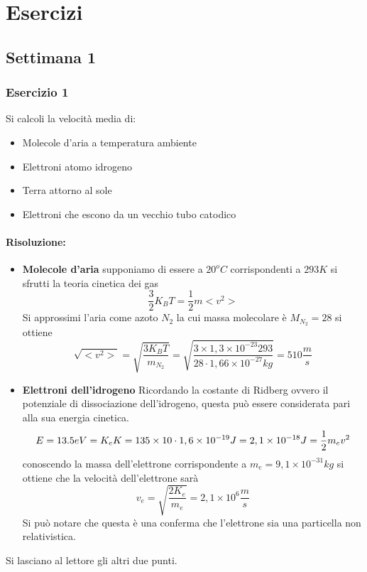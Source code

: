 
\section{Esercizi}
\subsection{Settimana 1}
\subsubsection{Esercizio 1}
Si calcoli la velocità media di:
\begin{itemize}
\item Molecole d'aria a temperatura ambiente
\item Elettroni atomo idrogeno
\item Terra attorno al sole
\item Elettroni che escono da un vecchio tubo catodico
\end{itemize}

\paragraph{Risoluzione:}
\begin{itemize}
\item \textbf{Molecole d'aria}
supponiamo di essere a $20^oC$ corrispondenti a $293K$ si sfrutti la teoria cinetica dei gas
\begin{equation}
\frac{3}{2}K_BT=\frac{1}{2}m<v^2>
\end{equation}
Si approssimi l'aria come azoto $N_2$ la cui massa molecolare è $M_{N_2}=28$
si ottiene
\begin{equation}
\sqrt{<v^2>}=\sqrt{\frac{3K_BT}{m_{N_2}}}=\sqrt{\frac{3\times1,3\times10^{-23}293}{28\cdot 1,66\times10^{-27}kg}}=510\frac{m}{s}
\end{equation}
\item \textbf{Elettroni dell'idrogeno}
Ricordando la costante di Ridberg ovvero il potenziale di dissociazione dell'idrogeno, questa può essere considerata pari alla sua energia cinetica.
\begin{equation}
E=13.5eV=K_e\\
K=135\times10\cdot1,6\times10^{-19}J=2,1\times10^{-18}J=\frac{1}{2}m_ev^2
\end{equation}
conoscendo la massa dell'elettrone corrispondente a $m_e=9,1\times10^{-31}kg$ si ottiene che la velocità dell'elettrone sarà
\begin{equation}
v_e=\sqrt{\frac{2K_e}{m_e}}=2,1\times10^6\frac{m}{s}
\end{equation}
Si può notare che questa è una conferma che l'elettrone sia una particella non relativistica.
\end{itemize}
Si lasciano al lettore gli altri due punti.

